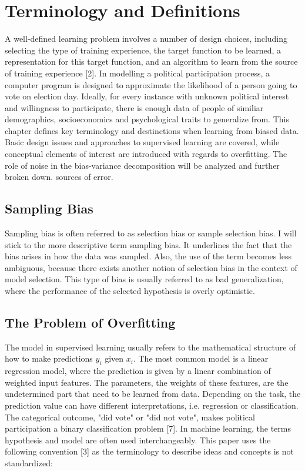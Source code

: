 \chapter{Terminology and Definitions}

A well-defined learning problem involves a number of design choices, including selecting the type of training experience, the target function to be learned, a representation for this target function, and an algorithm to learn from the source of training experience [2]. In modelling a political participation process, a computer program is designed to approximate the likelihood of a person going to vote on election day. Ideally, for every instance with unknown political interest and willingness to participate, there is enough data of people of similiar demographics, socioeconomics and psychological traits to generalize from. This chapter defines key terminology and destinctions when learning from biased data. Basic design issues and approaches to supervised learning are covered, while conceptual elements of interest are introduced with regards to overfitting. The role of noise in the bias-variance decomposition will be analyzed and further broken down. sources of error.

\section{Sampling Bias}


Sampling bias is often referred to as selection bias or sample selection bias. I will stick to the more descriptive term sampling bias. It underlines the fact that the bias arises in how the data was sampled. Also, the use of the term becomes less ambiguous, because there exists another notion of selection bias in the context of model selection. This type of bias is usually referred to as bad generalization, where the performance of the selected hypothesis is overly optimistic.

\section{The Problem of Overfitting}

The model in supervised learning usually refers to the mathematical structure of how to make predictions \(y_i\) given \(x_i\). The most common model is a linear regression model, where the prediction is given by a linear combination of weighted input features. The parameters, the weights of these features, are the undetermined part that need to be learned from data. Depending on the task, the prediction value can have different interpretations, i.e. regression or classiﬁcation. The categorical outcome, "did vote" or "did not vote", makes political participation a binary classiﬁcation problem [7]. In machine learning, the terms hypothesis and model are often used interchangeably. This paper uses the following convention [3] as the terminology to describe ideas and concepts is not standardized:

